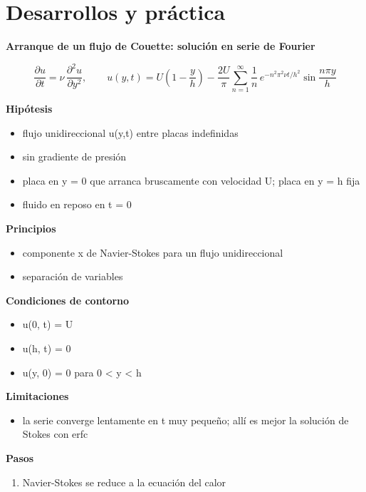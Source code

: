 \documentclass[10pt,openany]{book}
\begin{document}
\section{Desarrollos y práctica}

\begin{tcolorbox}[title={Desarrollos del modelo}, studiumdef, breakable]

\noindent\textbf{Arranque de un flujo de Couette: solución en serie de Fourier}

\begin{equation}
\frac{\partial u}{\partial t} = \nu\,\frac{\partial^{2}u}{\partial y^{2}},\qquad u(y,t) = U\left(1 - \frac{y}{h}\right) - \frac{2U}{\pi}\sum_{n=1}^{\infty}\frac{1}{n}\,e^{-n^{2}\pi^{2}\nu t/h^{2}}\sin\frac{n\pi y}{h}
\label{eq:m07-arranque}
\end{equation}

\noindent\textbf{Hipótesis}
\begin{itemize}
\item flujo unidireccional u(y,t) entre placas indefinidas
\item sin gradiente de presión
\item placa en y = 0 que arranca bruscamente con velocidad U; placa en y = h fija
\item fluido en reposo en t = 0
\end{itemize}

\noindent\textbf{Principios}
\begin{itemize}
\item componente x de Navier-Stokes para un flujo unidireccional
\item separación de variables
\end{itemize}

\noindent\textbf{Condiciones de contorno}
\begin{itemize}
\item u(0, t) = U
\item u(h, t) = 0
\item u(y, 0) = 0 para 0 < y < h
\end{itemize}

\noindent\textbf{Limitaciones}
\begin{itemize}
\item la serie converge lentamente en t muy pequeño; allí es mejor la solución de Stokes con erfc
\end{itemize}

\noindent\textbf{Pasos}
\begin{enumerate}
\item
Navier-Stokes se reduce a la ecuación del calor


\end{enumerate}
\end{tcolorbox}
\end{document}
